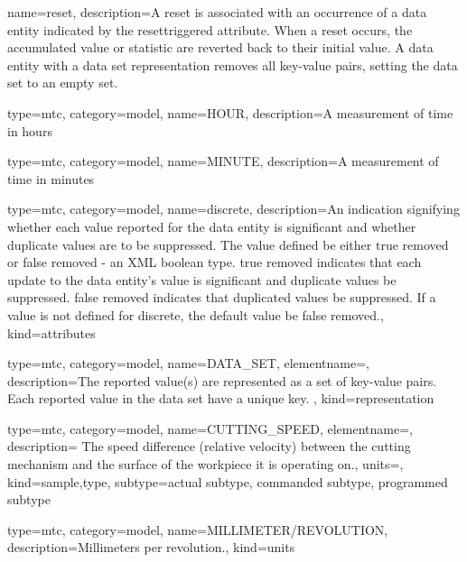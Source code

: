 {
  name={reset},
  description={A reset is associated with an occurrence of a \gls{data entity} indicated by the \gls{resettriggered} attribute. When a reset occurs, the accumulated value or statistic are reverted back to their initial value. A \gls{data entity} with a \gls{data set} representation removes all \glspl{key-value pair}, setting the \gls{data set} to an empty set.}
}


{
  type=mtc,
  category=model,
  name={HOUR},
  description={A measurement of time in hours}
}


{
  type=mtc,
  category=model,
  name={MINUTE},
  description={A measurement of time in minutes}
}


{
  type=mtc,
  category=model,
  name={discrete},
  description={An indication signifying whether each value reported for the \gls{data entity} is significant and whether duplicate values are to be suppressed.
  \newline The value defined \MUST be either \gls{true removed} or \gls{false removed} - an XML boolean type.
  \newline \gls{true removed} indicates that each update to the \gls{data entity}'s value is significant and duplicate values \MUSTNOT be suppressed.
  \newline \gls{false removed} indicates that duplicated values \MUST be suppressed.
  \newline If a value is not defined for \gls{discrete}, the default value \MUST be \gls{false removed}.},
  kind={attributes}
}


{
  type=mtc,
  category=model,
  name={DATA\_SET},
  elementname=,
  description={The reported value(s) are represented as a set of \glspl{key-value pair}.
  \newline Each reported value in the \gls{data set} \MUST have a unique key. },
  kind={representation}
}


{
  type=mtc,
  category=model,
  name={CUTTING\_SPEED},
  elementname=,
  description={ The speed difference (relative velocity) between the cutting mechanism and the surface of the workpiece it is operating on.},
  units=,
  kind={sample,type},
  subtype={\gls{actual subtype}, \gls{commanded subtype}, \gls{programmed subtype}}
}


{
  type=mtc,
  category=model,
  name={MILLIMETER/REVOLUTION},
  description={Millimeters per revolution.},
  kind={units}
}


